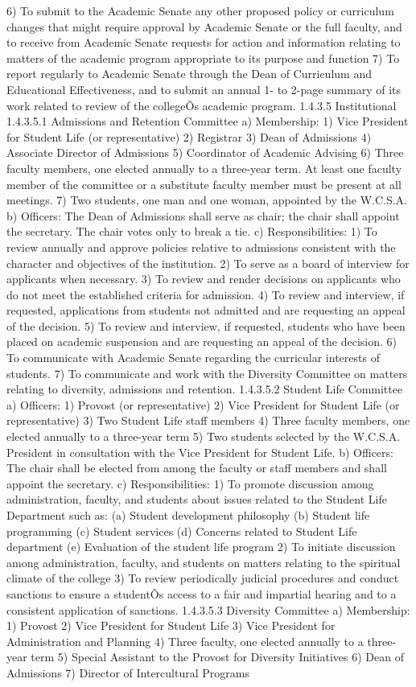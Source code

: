 \documentclass[letterpaper, 11pt]{article}
\begin{document}
6) To submit to the Academic Senate any other proposed policy or curriculum changes that might require approval by Academic Senate or the full faculty, and to receive from Academic Senate requests for action and information relating to matters of the academic program appropriate to its purpose and function
7) To report regularly to Academic Senate through the Dean of Curriculum and Educational Effectiveness, and to submit an annual 1- to 2-page summary of its work related to review of the collegeÕs academic program.
1.4.3.5 Institutional
1.4.3.5.1 Admissions and Retention Committee
a) Membership:
1) Vice President for Student Life (or representative)
2) Registrar
3) Dean of Admissions
4) Associate Director of Admissions
5) Coordinator of Academic Advising
6) Three faculty members, one elected annually to a three-year term.  At least one faculty member of the committee or a substitute faculty member must be present at all meetings.
7) Two students, one man and one woman, appointed by the W.C.S.A.
b) Officers:
   The Dean of Admissions shall serve as chair; the chair shall appoint the secretary.  The chair votes only to break a tie.
c) Responsibilities:
1) To review annually and approve policies relative to admissions consistent with the character and objectives of the institution.
2) To serve as a board of interview for applicants when necessary.
3) To review and render decisions on applicants who do not meet the established criteria for admission.
4) To review and interview, if requested, applications from students not admitted and are requesting an appeal of the decision.
5) To review and interview, if requested, students who have been placed on academic suspension and are requesting an appeal of the decision.
6) To communicate with Academic Senate regarding the curricular interests of students.
7) To communicate and work with the Diversity Committee on matters relating to diversity, admissions and retention.
1.4.3.5.2 Student Life Committee
a) Officers:
1) Provost (or representative)
2) Vice President for Student Life (or representative)
3) Two Student Life staff members
4) Three faculty members, one elected annually to a three-year term
5) Two students selected by the W.C.S.A. President in consultation with the Vice President for Student Life.
b) Officers:
   The chair shall be elected from among the faculty or staff members and shall appoint the secretary.
c) Responsibilities:
1) To promote discussion among administration, faculty, and students about issues related to the Student Life Department such as:
(a) Student development philosophy
(b) Student life programming
(c) Student services
(d) Concerns related to Student Life department
(e) Evaluation of the student life program
2) To initiate discussion among administration, faculty, and students on matters relating to the spiritual climate of the college
3) To review periodically judicial procedures and conduct sanctions to ensure a studentÕs access to a fair and impartial hearing and to a consistent application of sanctions.
1.4.3.5.3 Diversity Committee
a) Membership:
1) Provost
2) Vice President for Student Life 
3) Vice President for Administration and Planning
4) Three faculty, one elected annually to a three-year term
5) Special Assistant to the Provost for Diversity Initiatives
6) Dean of Admissions
7) Director of Intercultural Programs
\end{document}
